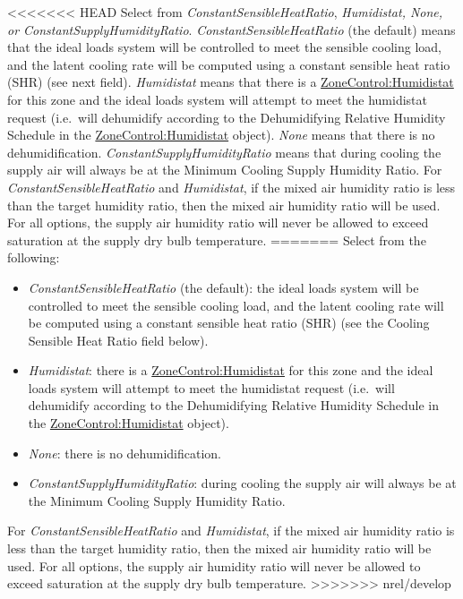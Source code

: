<<<<<<< HEAD
Select from \emph{ConstantSensibleHeatRatio}, \emph{Humidistat, None, or ConstantSupplyHumidityRatio}. \emph{ConstantSensibleHeatRatio} (the default) means that the ideal loads system will be controlled to meet the sensible cooling load, and the latent cooling rate will be computed using a constant sensible heat ratio (SHR) (see next field). \emph{Humidistat} means that there is a \hyperref[zonecontrolhumidistat]{ZoneControl:Humidistat} for this zone and the ideal loads system will attempt to meet the humidistat request (i.e.~will dehumidify according to the Dehumidifying Relative Humidity Schedule in the \hyperref[zonecontrolhumidistat]{ZoneControl:Humidistat} object). \emph{None} means that there is no dehumidification. \emph{ConstantSupplyHumidityRatio} means that during cooling the supply air will always be at the Minimum Cooling Supply Humidity Ratio. For \emph{ConstantSensibleHeatRatio} and \emph{Humidistat}, if the mixed air humidity ratio is less than the target humidity ratio, then the mixed air humidity ratio will be used. For all options, the supply air humidity ratio will never be allowed to exceed saturation at the supply dry bulb temperature.
=======
Select from the following:

\begin{itemize}
\item
  \emph{ConstantSensibleHeatRatio} (the default): the ideal loads system will be controlled to meet the sensible cooling load, and the latent cooling rate will be computed using a constant sensible heat ratio (SHR) (see the Cooling Sensible Heat Ratio field below).
\item
  \emph{Humidistat}: there is a \hyperref[zonecontrolhumidistat]{ZoneControl:Humidistat} for this zone and the ideal loads system will attempt to meet the humidistat request (i.e.~will dehumidify according to the Dehumidifying Relative Humidity Schedule in the \hyperref[zonecontrolhumidistat]{ZoneControl:Humidistat} object).
\item
  \emph{None}: there is no dehumidification.
\item
  \emph{ConstantSupplyHumidityRatio}: during cooling the supply air will always be at the Minimum Cooling Supply Humidity Ratio.
\end{itemize}

For \emph{ConstantSensibleHeatRatio} and \emph{Humidistat}, if the mixed air humidity ratio is less than the target humidity ratio, then the mixed air humidity ratio will be used. For all options, the supply air humidity ratio will never be allowed to exceed saturation at the supply dry bulb temperature.
>>>>>>> nrel/develop

